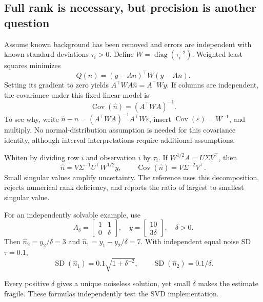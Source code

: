 \subsection{Full rank is necessary, but precision is another question}
Assume known background has been removed and errors are independent with known standard deviations $\tau_i>0$. Define $W=\operatorname{diag}(\tau_i^{-2})$. Weighted least squares minimizes
\begin{equation}
Q(n)=(y-An)^\top W(y-An).
\end{equation}
Setting its gradient to zero yields $A^\top WA\widehat n=A^\top Wy$. If columns are independent, the covariance under this fixed linear model is
\begin{equation}
\operatorname{Cov}(\widehat n)=(A^\top WA)^{-1}. \label{eq:cov}
\end{equation}
To see why, write $\widehat n-n=(A^\top WA)^{-1}A^\top W\varepsilon$, insert $\operatorname{Cov}(\varepsilon)=W^{-1}$, and multiply. No normal-distribution assumption is needed for this covariance identity, although interval interpretations require additional assumptions.

Whiten by dividing row $i$ and observation $i$ by $\tau_i$. If
$W^{1/2}A=U\Sigma V^\top$, then
\begin{equation}
\widehat n=V\Sigma^{-1}U^\top W^{1/2}y,\qquad
\operatorname{Cov}(\widehat n)=V\Sigma^{-2}V^\top.
\end{equation}
Small singular values amplify uncertainty. The reference uses this decomposition, rejects numerical rank deficiency, and reports the ratio of largest to smallest singular value.

For an independently solvable example, use
\begin{equation}
A_\delta=\begin{bmatrix}1&1\\0&\delta\end{bmatrix},
\quad y=\begin{bmatrix}10\\3\delta\end{bmatrix},\quad \delta>0.
\end{equation}
Then $\widehat n_2=y_2/\delta=3$ and $\widehat n_1=y_1-y_2/\delta=7$. With independent equal noise SD $\tau=0.1$,
\begin{equation}
\operatorname{SD}(\widehat n_1)=0.1\sqrt{1+\delta^{-2}},
\qquad \operatorname{SD}(\widehat n_2)=0.1/\delta.
\end{equation}
\begin{center}\end{center}
Every positive $\delta$ gives a unique noiseless solution, yet small $\delta$ makes the estimate fragile. These formulas independently test the SVD implementation.

